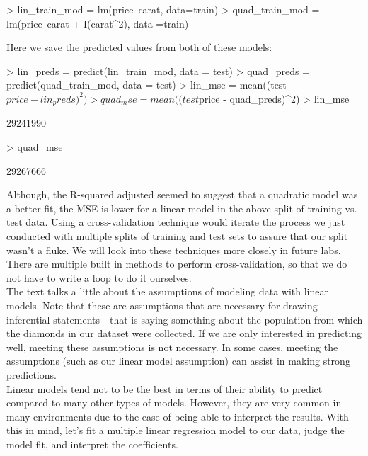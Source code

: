 \documentclass{article}
\begin{document}
\begin{Schunk}
\begin{Sinput}
> lin_train_mod = lm(price~carat, data=train)
> quad_train_mod = lm(price~carat + I(carat^2), data =train)
\end{Sinput}
\end{Schunk}

Here we save the predicted values from both of these models:

\begin{Schunk}
\begin{Sinput}
> lin_preds = predict(lin_train_mod, data = test)
> quad_preds = predict(quad_train_mod, data = test)
> lin_mse = mean((test$price - lin_preds)^2)
> quad_mse = mean((test$price - quad_preds)^2)
> lin_mse
\end{Sinput}
\begin{Soutput}
[1] 29241990
\end{Soutput}
\begin{Sinput}
> quad_mse
\end{Sinput}
\begin{Soutput}
[1] 29267666
\end{Soutput}
\end{Schunk}


Although, the R-squared adjusted seemed to suggest that a quadratic model was a better fit, the MSE is lower for a linear model in the above split of training vs. test data.  Using a cross-validation technique would iterate the process we just conducted with multiple splits of training and test sets to assure that our split wasn't a fluke.  We will look into these techniques more closely in future labs.  There are multiple built in methods to perform cross-validation, so that we do not have to write a loop to do it ourselves.\\[.25cm]

The text talks a little about the assumptions of modeling data with linear models.  Note that these are assumptions that are necessary for drawing inferential statements - that is saying something about the population from which the diamonds in our dataset were collected.  If we are only interested in predicting well, meeting these assumptions is not necessary.  In some cases, meeting the assumptions (such as our linear model assumption) can assist in making strong predictions.\\[.25cm]

Linear models tend not to be the best in terms of their ability to predict compared to many other types of models.  However, they are very common in many environments due to the ease of being able to interpret the results.  With this in mind, let's fit a multiple linear regression model to our data, judge the model fit, and interpret the coefficients.\\
\end{document}
